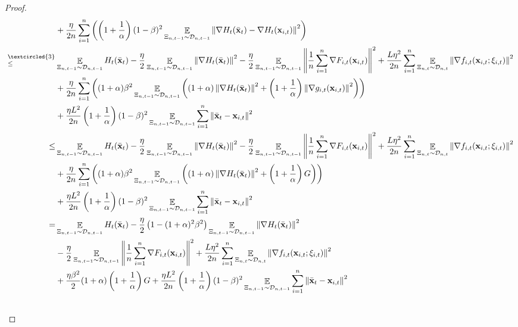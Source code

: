 \documentclass{article}
\begin{document}
\begin{proof}
\begin{align}
& + \frac{\eta}{2n}\sum_{i=1}^n\lrincir{ \lrincir{1+\frac{1}{\alpha}}(1-\beta)^2\EE_{ \Xi_{n,t-1} \sim \Dcal_{n,t-1} }\lrnorm{\nabla H_t(\bar{\x}_t) - \nabla H_t(\x_{i,t})}^2  }  \\ \nonumber
\refabovecir{\le}{\textcircled{3}} & \EE_{ \Xi_{n,t-1} \sim \Dcal_{n,t-1} } H_t(\bar{\x}_t) - \frac{\eta}{2}\EE_{ \Xi_{n,t-1} \sim \Dcal_{n,t-1} }\lrnorm{\nabla H_t(\bar{\x}_t)}^2 - \frac{\eta}{2}\EE_{ \Xi_{n,t-1} \sim \Dcal_{n,t-1} }\lrnorm{\frac{1}{n}\sum_{i=1}^n \nabla F_{i,t}(\x_{i,t})}^2  + \frac{L\eta^2}{2n}\sum_{i=1}^n\EE_{ \Xi_{n,t} \sim \Dcal_{n,t} }\lrnorm{ \nabla f_{i,t}(\x_{i,t};\xi_{i,t})}^2 \\ \nonumber
& + \frac{\eta}{2n}\sum_{i=1}^n\lrincir{(1+\alpha)\beta^2\EE_{ \Xi_{n,t-1} \sim \Dcal_{n,t-1} }\lrincir{ (1+\alpha)  \lrnorm{\nabla H_t(\bar{\x}_t) }^2 +  \lrincir{1+\frac{1}{\alpha}}   \lrnorm{\nabla g_{i,t}(\x_{i,t})}^2 } } \\ \nonumber 
& + \frac{\eta L^2}{2n} \lrincir{1+\frac{1}{\alpha}}(1-\beta)^2\EE_{ \Xi_{n,t-1} \sim \Dcal_{n,t-1} }\sum_{i=1}^n\lrnorm{\bar{\x}_t - \x_{i,t}}^2    \\ \nonumber
\le & \EE_{ \Xi_{n,t-1} \sim \Dcal_{n,t-1} } H_t(\bar{\x}_t) - \frac{\eta}{2}\EE_{ \Xi_{n,t-1} \sim \Dcal_{n,t-1} }\lrnorm{\nabla H_t(\bar{\x}_t)}^2 - \frac{\eta}{2}\EE_{ \Xi_{n,t-1} \sim \Dcal_{n,t-1} }\lrnorm{\frac{1}{n}\sum_{i=1}^n \nabla F_{i,t}(\x_{i,t})}^2  + \frac{L\eta^2}{2n}\sum_{i=1}^n\EE_{ \Xi_{n,t} \sim \Dcal_{n,t} }\lrnorm{ \nabla f_{i,t}(\x_{i,t};\xi_{i,t})}^2 \\ \nonumber
& + \frac{\eta}{2n}\sum_{i=1}^n\lrincir{(1+\alpha)\beta^2\EE_{ \Xi_{n,t-1} \sim \Dcal_{n,t-1} }\lrincir{ (1+\alpha)  \lrnorm{\nabla H_t(\bar{\x}_t) }^2 +  \lrincir{1+\frac{1}{\alpha}}  G } } \\ \nonumber 
& + \frac{\eta L^2}{2n} \lrincir{1+\frac{1}{\alpha}}(1-\beta)^2\EE_{ \Xi_{n,t-1} \sim \Dcal_{n,t-1} }\sum_{i=1}^n\lrnorm{\bar{\x}_t - \x_{i,t}}^2    \\ \nonumber
= & \EE_{ \Xi_{n,t-1} \sim \Dcal_{n,t-1} } H_t(\bar{\x}_t) - \frac{\eta}{2} \lrincir{ 1-(1+\alpha)^2\beta^2 } \EE_{ \Xi_{n,t-1} \sim \Dcal_{n,t-1} }\lrnorm{\nabla H_t(\bar{\x}_t)}^2 \\ \nonumber 
& - \frac{\eta}{2}  \EE_{ \Xi_{n,t-1} \sim \Dcal_{n,t-1} }\lrnorm{\frac{1}{n}\sum_{i=1}^n \nabla F_{i,t}(\x_{i,t})}^2  + \frac{L\eta^2}{2n}\sum_{i=1}^n\EE_{ \Xi_{n,t} \sim \Dcal_{n,t} }\lrnorm{ \nabla f_{i,t}(\x_{i,t};\xi_{i,t})}^2 \\ \nonumber
& + \frac{\eta \beta^2}{2} (1+\alpha) \lrincir{1+\frac{1}{\alpha}}  G  + \frac{\eta L^2}{2n} \lrincir{1+\frac{1}{\alpha}}(1-\beta)^2\EE_{ \Xi_{n,t-1} \sim \Dcal_{n,t-1} }\sum_{i=1}^n\lrnorm{\bar{\x}_t - \x_{i,t}}^2 \\ \nonumber

\end{align}
\end{proof}
\end{document}
